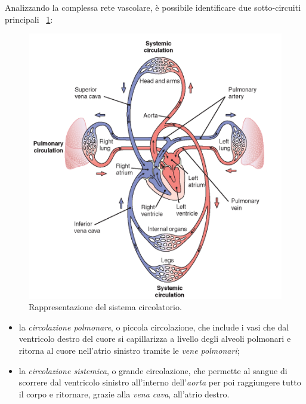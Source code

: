 Analizzando la complessa rete vascolare, è possibile identificare due sotto-circuiti principali \Fig~\ref{fig:SistemaCircolatorio}:
\begin{figure}[h]
	\centering
	\includegraphics[width=0.7\linewidth]{ImageFiles/Fotopletismografia/SistemaCircolatorio}
	\caption{Rappresentazione del sistema circolatorio.}
	\label{fig:SistemaCircolatorio}
\end{figure}
\begin{itemize}
	\item la \textit{circolazione polmonare}, o piccola circolazione, che include i vasi che dal ventricolo destro del cuore si capillarizza a livello degli alveoli polmonari e ritorna al cuore nell'atrio sinistro tramite le \textit{vene polmonari};
	\item la \textit{circolazione sistemica}, o grande circolazione, che permette al sangue di scorrere dal ventricolo sinistro all'interno dell'\textit{aorta} per poi raggiungere tutto il corpo e ritornare, grazie alla \textit{vena cava}, all'atrio destro.
\end{itemize}
